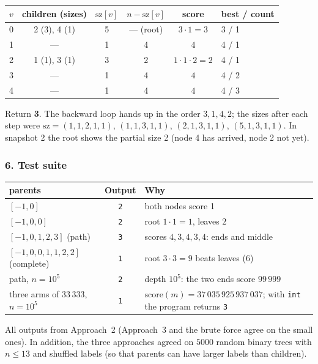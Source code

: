 \begin{tracebox}[{Example 1: $\texttt{parents} = [-1,2,0,2,0]$, $n = 5$}]
\begin{center}
\end{center}
\begin{center}\small
\begin{tabular}{@{}cccccl@{}}
\toprule
$v$ & children (sizes) & $\mathrm{sz}[v]$ & $n - \mathrm{sz}[v]$ & score & best / count \\
\midrule
0 & 2 (3), 4 (1) & 5 & --- (root) & $3 \cdot 1 = 3$ & 3 / 1 \\
1 & --- & 1 & 4 & $4$ & 4 / 1 \\
2 & 1 (1), 3 (1) & 3 & 2 & $1 \cdot 1 \cdot 2 = 2$ & 4 / 1 \\
3 & --- & 1 & 4 & $4$ & 4 / 2 \\
4 & --- & 1 & 4 & $4$ & 4 / 3 \\
\bottomrule
\end{tabular}
\end{center}
Return \textbf{3}. The backward loop hands up in the order $3, 1, 4, 2$; the sizes after each step were $\mathrm{sz} = (1,1,2,1,1)$, $(1,1,3,1,1)$, $(2,1,3,1,1)$, $(5,1,3,1,1)$. In snapshot 2 the root shows the partial size 2 (node 4 has arrived, node 2 not yet).
\end{tracebox}

\subsubsection*{6. Test suite}

\begin{testbox}
\centering\small
\begin{tabular}{@{}p{5.6cm}cp{6.0cm}@{}}
\toprule
\textbf{parents} & \textbf{Output} & \textbf{Why} \\
\midrule
$[-1,0]$ & \texttt{2} & both nodes score 1 \\
$[-1,0,0]$ & \texttt{2} & root $1 \cdot 1 = 1$, leaves $2$ \\
$[-1,0,1,2,3]$ (path) & \texttt{3} & scores $4,3,4,3,4$: ends and middle \\
$[-1,0,0,1,1,2,2]$ (complete) & \texttt{1} & root $3 \cdot 3 = 9$ beats leaves (6) \\
path, $n = 10^5$ & \texttt{2} & depth $10^5$: the two ends score $99\,999$ \\
three arms of $33\,333$, $n = 10^5$ & \texttt{1} & $\mathrm{score}(m) = 37\,035\,925\,937\,037$; with \texttt{int} the program returns \texttt{3} \\
\bottomrule
\end{tabular}
\end{testbox}
All outputs from Approach~2 (Approach~3 and the brute force agree on the small ones). In addition, the three approaches agreed on $5000$ random binary trees with $n \le 13$ and shuffled labels (so that parents can have larger labels than children).

